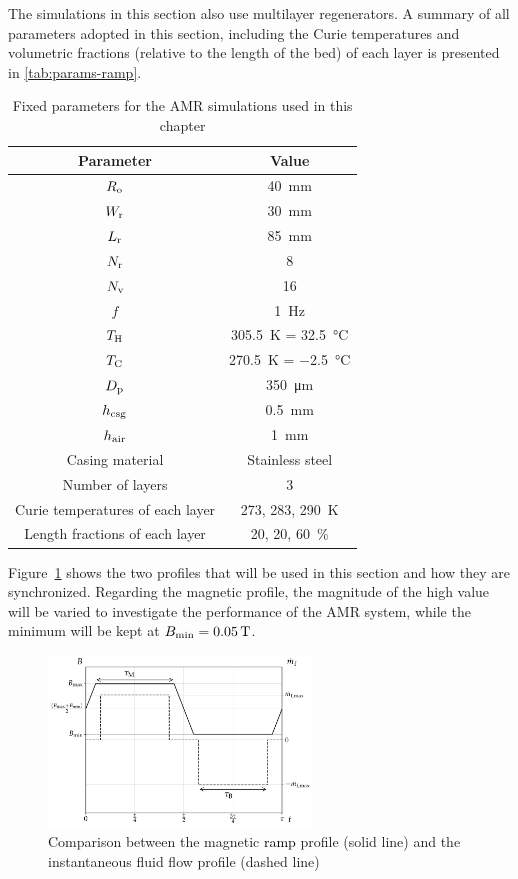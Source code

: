 \documentclass[referee]{svjour3}
\newcommand{\bmin}{\ensuremath{{B}\ped{min}}}
\begin{document}
The simulations in this section also use multilayer regenerators. A summary of all parameters adopted in this section, including the Curie temperatures and volumetric fractions (relative to the length of the bed) of each layer is presented in \autoref{tab:params-ramp}.

\begin{table}[!ht]
  \centering
  \begin{tabular}{c|c}
\hline
    \textbf{Parameter} & \textbf{Value} \\
\hline
$R_{\mathrm{o}}$ & \SI{40}{\mm} \\
$W_{\mathrm{r}}$ & \SI{30}{\mm} \\
$L_{\mathrm{r}}$ & \SI{85}{\mm} \\
$N_{\mathrm{r}}$ & \num{8} \\
$N_{\mathrm{v}}$ & \num{16} \\
$f$ & \SI{1}{\hertz} \\
$T_{\mathrm{H}}$ & \SI{305.5}{\kelvin} = \SI{32.5}{\celsius} \\
$T_{\mathrm{C}}$ & \SI{270.5}{\kelvin} = \SI{-2.5}{\celsius} \\
$D_{\mathrm{p}}$ & \SI{350}{\micro\meter} \\
$h_{\mathrm{csg}}$ & \SI{0.5}{\mm} \\
$h_{\mathrm{air}}$ & \SI{1}{\mm} \\
Casing material & Stainless steel \\
Number of layers & \num{3} \\
Curie temperatures of each layer & \num{273}, \num{283}, \SI{290}{\kelvin} \\ 
Length fractions of each layer & \num{20}, \num{20}, \SI{60}{\percent}\\
\hline
  \end{tabular}
  \caption{Fixed parameters for the AMR simulations used in this chapter}
  \label{tab:params-ramp}
\end{table}

 Figure~\ref{fig:ramp-inst} shows the two profiles that will be used in this section and how they are synchronized. Regarding the magnetic profile, the magnitude of the high value will be varied to investigate the performance of the AMR system, while the minimum will be kept at $\bmin = \SI{0.05}{\tesla}$. 

\begin{figure}[!ht]
  \centering
  \includegraphics[width=7cm]{profiles_rm_and_flow_instantaneous}
  \caption{Comparison between the magnetic \textcolor{black}{ramp} profile (solid line) and the instantaneous fluid flow profile (dashed line)}
  \label{fig:ramp-inst}
\end{figure}
 
\end{document}
